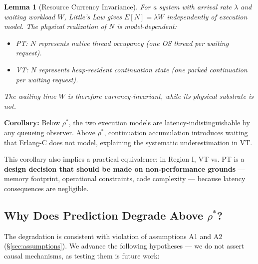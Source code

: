 \documentclass[10pt]{article}
\newtheorem{lemma}{Lemma}
\begin{document}
\begin{lemma}[Resource Currency Invariance]
For a system with arrival rate $\lambda$ and waiting workload $W$, Little's Law gives $E[N] = \lambda W$ independently of execution model. The physical realization of $N$ is model-dependent:
\begin{itemize}
\item PT: $N$ represents native thread occupancy (one OS thread per waiting request).
\item VT: $N$ represents heap-resident continuation state (one parked continuation per waiting request).
\end{itemize}
The waiting time $W$ is therefore currency-invariant, while its physical substrate is not.
\end{lemma}

\textbf{Corollary:} Below $\rho^*$, the two execution models are latency-indistinguishable by any queueing observer. Above $\rho^*$, continuation accumulation introduces waiting that Erlang-C does not model, explaining the systematic underestimation in VT.

This corollary also implies a practical equivalence: in Region I, VT vs. PT is a \textbf{design decision that should be made on non-performance grounds} --- memory footprint, operational constraints, code complexity --- because latency consequences are negligible.

\subsection{Why Does Prediction Degrade Above $\rho^*$?}
\label{sec:errordiscussion}

The degradation is consistent with violation of assumptions A1 and A2 (\S\ref{sec:assumptions}). We advance the following hypotheses --- we do not assert causal mechanisms, as testing them is future work:
\end{document}
